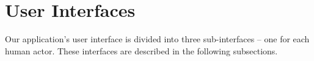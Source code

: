 \section{User Interfaces}
\label{sec:interfaces}
Our application's user interface is divided into three sub-interfaces -- one for each human actor.
These interfaces are described in the following subsections.



